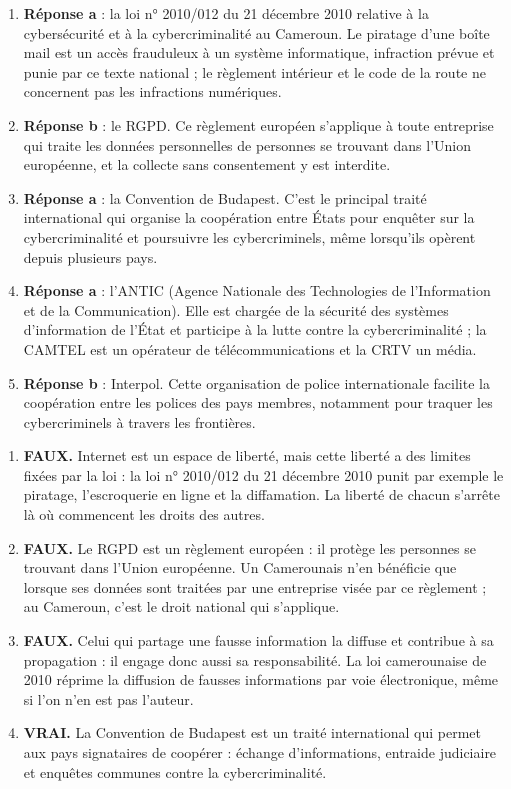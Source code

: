 \documentclass[11pt]{article}
\begin{document}
\begin{corrige}
\begin{enumerate}
\item \textbf{Réponse a} : la loi n° 2010/012 du 21 décembre 2010 relative à la cybersécurité et à la cybercriminalité au Cameroun. Le piratage d'une boîte mail est un accès frauduleux à un système informatique, infraction prévue et punie par ce texte national ; le règlement intérieur et le code de la route ne concernent pas les infractions numériques.
\item \textbf{Réponse b} : le RGPD. Ce règlement européen s'applique à toute entreprise qui traite les données personnelles de personnes se trouvant dans l'Union européenne, et la collecte sans consentement y est interdite.
\item \textbf{Réponse a} : la Convention de Budapest. C'est le principal traité international qui organise la coopération entre États pour enquêter sur la cybercriminalité et poursuivre les cybercriminels, même lorsqu'ils opèrent depuis plusieurs pays.
\item \textbf{Réponse a} : l'ANTIC (Agence Nationale des Technologies de l'Information et de la Communication). Elle est chargée de la sécurité des systèmes d'information de l'État et participe à la lutte contre la cybercriminalité ; la CAMTEL est un opérateur de télécommunications et la CRTV un média.
\item \textbf{Réponse b} : Interpol. Cette organisation de police internationale facilite la coopération entre les polices des pays membres, notamment pour traquer les cybercriminels à travers les frontières.
\end{enumerate}
\end{corrige}

\begin{corrige}
\begin{enumerate}
\item \textbf{FAUX.} Internet est un espace de liberté, mais cette liberté a des limites fixées par la loi : la loi n° 2010/012 du 21 décembre 2010 punit par exemple le piratage, l'escroquerie en ligne et la diffamation. La liberté de chacun s'arrête là où commencent les droits des autres.
\item \textbf{FAUX.} Le RGPD est un règlement européen : il protège les personnes se trouvant dans l'Union européenne. Un Camerounais n'en bénéficie que lorsque ses données sont traitées par une entreprise visée par ce règlement ; au Cameroun, c'est le droit national qui s'applique.
\item \textbf{FAUX.} Celui qui partage une fausse information la diffuse et contribue à sa propagation : il engage donc aussi sa responsabilité. La loi camerounaise de 2010 réprime la diffusion de fausses informations par voie électronique, même si l'on n'en est pas l'auteur.
\item \textbf{VRAI.} La Convention de Budapest est un traité international qui permet aux pays signataires de coopérer : échange d'informations, entraide judiciaire et enquêtes communes contre la cybercriminalité.
\end{enumerate}
\end{corrige}
\end{document}
